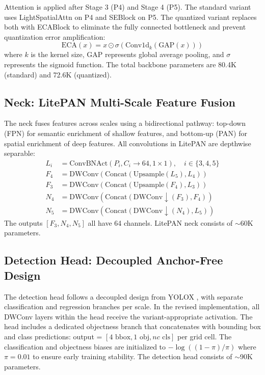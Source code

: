 \documentclass[article,submit,moreauthors,pdftex,10pt,a4paper]{article}
\begin{document}
Attention is applied after Stage 3 (P4) and Stage 4 (P5). The standard variant uses LightSpatialAttn on P4 and SEBlock on P5. The quantized variant replaces both with ECABlock to eliminate the fully connected bottleneck and prevent quantization error amplification:
\begin{equation}
\text{ECA}(x) = x \odot \sigma(\text{Conv1d}_{k}(\text{GAP}(x)))
\end{equation}
where $k$ is the kernel size, $\text{GAP}$ represents global average pooling, and $\sigma$ represents the sigmoid function. The total backbone parameters are 80.4K (standard) and 72.6K (quantized).

\subsection{Neck: LitePAN Multi-Scale Feature Fusion}
The neck fuses features across scales using a bidirectional pathway: top-down (FPN) for semantic enrichment of shallow features, and bottom-up (PAN) for spatial enrichment of deep features. All convolutions in LitePAN are depthwise separable:
\begin{align}
  L_i &= \text{ConvBNAct}(P_i, C_i \to 64, 1\times1), \quad i \in \{3, 4, 5\} \\
  F_4 &= \text{DWConv}(\text{Concat}(\text{Upsample}(L_5), L_4)) \\
  F_3 &= \text{DWConv}(\text{Concat}(\text{Upsample}(F_4), L_3)) \\
  N_4 &= \text{DWConv}(\text{Concat}(\text{DWConv}\downarrow(F_3), F_4)) \\
  N_5 &= \text{DWConv}(\text{Concat}(\text{DWConv}\downarrow(N_4), L_5))
\end{align}
The outputs $[F_3, N_4, N_5]$ all have 64 channels. LitePAN neck consists of $\sim$60K parameters.

\subsection{Detection Head: Decoupled Anchor-Free Design}
The detection head follows a decoupled design from YOLOX \cite{ge2021yolox}, with separate classification and regression branches per scale. In the revised implementation, all DWConv layers within the head receive the variant-appropriate activation. The head includes a dedicated objectness branch that concatenates with bounding box and class predictions: output = $[4 \text{ bbox}, 1 \text{ obj}, nc \text{ cls}]$ per grid cell. The classification and objectness biases are initialized to $-\log((1-\pi)/\pi)$ where $\pi = 0.01$ to ensure early training stability. The detection head consists of $\sim$90K parameters.
\end{document}
